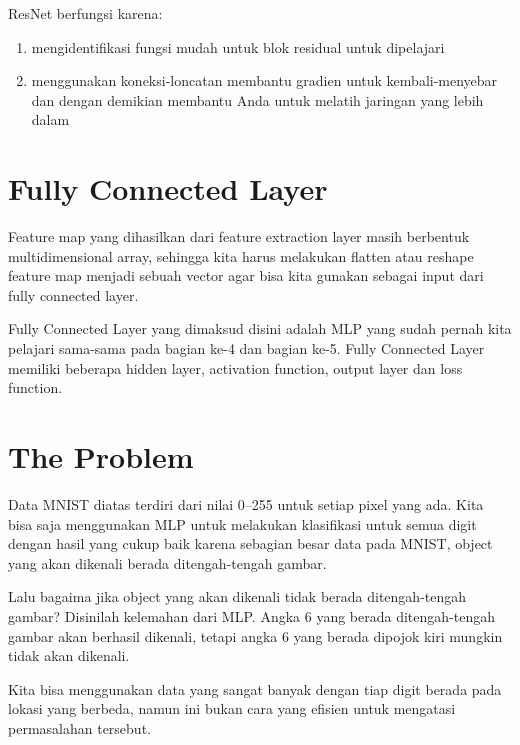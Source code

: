 ResNet berfungsi karena:

\begin{enumerate}
\item mengidentifikasi fungsi mudah untuk blok residual untuk dipelajari
\item menggunakan koneksi-loncatan membantu gradien untuk kembali-menyebar dan dengan demikian membantu Anda untuk melatih jaringan yang lebih dalam
\end{enumerate}


\section{Fully Connected Layer} 
Feature map yang dihasilkan dari feature extraction layer masih berbentuk multidimensional array, sehingga kita harus melakukan flatten atau reshape feature map menjadi sebuah vector agar bisa kita gunakan sebagai input dari fully connected layer.

Fully Connected Layer yang dimaksud disini adalah MLP yang sudah pernah kita pelajari sama-sama pada bagian ke-4 dan bagian ke-5. Fully Connected Layer memiliki beberapa hidden layer, activation function, output layer dan loss function.

\section{The Problem}
Data MNIST diatas terdiri dari nilai 0–255 untuk setiap pixel yang ada. Kita bisa saja menggunakan MLP untuk melakukan klasifikasi untuk semua digit dengan hasil yang cukup baik karena sebagian besar data pada MNIST, object yang akan dikenali berada ditengah-tengah gambar.

Lalu bagaima jika object yang akan dikenali tidak berada ditengah-tengah gambar? Disinilah kelemahan dari MLP. Angka 6 yang berada ditengah-tengah gambar akan berhasil dikenali, tetapi angka 6 yang berada dipojok kiri mungkin tidak akan dikenali.

Kita bisa menggunakan data yang sangat banyak dengan tiap digit berada pada lokasi yang berbeda, namun ini bukan cara yang efisien untuk mengatasi permasalahan tersebut.

